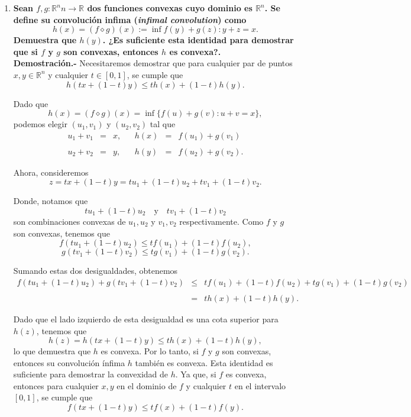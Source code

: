 \begin{enumerate}
    \item \textbf{\boldmath Sean $f, g : \mathbb{R}^nn \to \mathbb{R}$ dos funciones convexas cuyo dominio es $\mathbb{R}^n$. Se define su convolución infima (\textit{infimal convolution}) como
    $$h(x) = (f\diamond g)(x) :=  \inf{f(y) + g(z) : y + z = x}.$$
    Demuestra que $h(y)$. ¿Es suficiente esta identidad para demostrar que si $f$ y $g$ son convexas, entonces $h$ es convexa?.}\\
	
	\textbf{Demostración.-}\; Necesitaremos demostrar que para cualquier par de puntos $x, y \in \mathbb{R}^n$ y cualquier $t \in [0,1]$, se cumple que
	$$h(tx + (1-t)y) \leq t h(x) + (1-t) h(y).$$

	Dado que 
	$$h(x) = (f \diamond g)(x) = \inf\{f(u) + g(v) : u + v = x\},$$ 
	podemos elegir $(u_1, v_1)$ y $(u_2, v_2)$ tal que 
	$$
	\begin{array}{rclcrcl}
	    u_1 + v_1 &=& x, & & h(x) &=& f(u_1) + g(v_1)\\\\
	    u_2 + v_2 &=& y, & & h(y) &=& f(u_2) + g(v_2).
	\end{array}
	$$

	Ahora, consideremos 
	$$z = tx + (1-t)y = tu_1 + (1-t)u_2 + tv_1 + (1-t)v_2.$$ 

	Donde, notamos que 
	$$tu_1 + (1-t)u_2 \quad \text{y}\quad tv_1 + (1-t)v_2$$ 
	son combinaciones convexas de $u_1, u_2$ y $v_1, v_2$ respectivamente. Como $f$ y $g$ son convexas, tenemos que
	$$f(tu_1 + (1-t)u_2) \leq t f(u_1) + (1-t) f(u_2),$$
	$$g(tv_1 + (1-t)v_2) \leq t g(v_1) + (1-t) g(v_2).$$

	Sumando estas dos desigualdades, obtenemos
	$$
	\begin{array}{rcl}
	    f(tu_1 + (1-t)u_2) + g(tv_1 + (1-t)v_2) &\leq& t f(u_1) + (1-t) f(u_2) + t g(v_1) + (1-t) g(v_2)\\\\
						    &=& t h(x) + (1-t) h(y).
	\end{array}
	$$

	Dado que el lado izquierdo de esta desigualdad es una cota superior para $h(z)$, tenemos que
	$$h(z) = h(tx + (1-t)y) \leq t h(x) + (1-t) h(y),$$
	lo que demuestra que $h$ es convexa. Por lo tanto, si $f$ y $g$ son convexas, entonces su convolución ínfima $h$ también es convexa. Esta identidad es suficiente para demostrar la convexidad de $h$. Ya que, si $f$ es convexa, entonces para cualquier $x, y$ en el dominio de $f$ y cualquier $t$ en el intervalo $[0,1]$, se cumple que
	$$f(tx + (1-t)y) \leq t f(x) + (1-t) f(y).$$


\end{enumerate}
